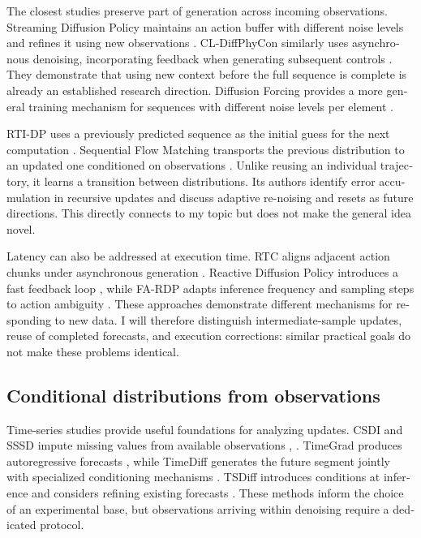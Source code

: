 \documentclass{article}
\begin{document}
\begin{otherlanguage}{english}
The closest studies preserve part of generation across incoming observations. Streaming Diffusion Policy maintains an action buffer with different noise levels and refines it using new observations \citep{p01}. CL-DiffPhyCon similarly uses asynchronous denoising, incorporating feedback when generating subsequent controls \citep{p02}. They demonstrate that using new context before the full sequence is complete is already an established research direction. Diffusion Forcing provides a more general training mechanism for sequences with different noise levels per element \citep{p05}.

RTI-DP uses a previously predicted sequence as the initial guess for the next computation \citep{p04}. Sequential Flow Matching transports the previous distribution to an updated one conditioned on observations \citep{p03}. Unlike reusing an individual trajectory, it learns a transition between distributions. Its authors identify error accumulation in recursive updates and discuss adaptive re-noising and resets as future directions. This directly connects to my topic but does not make the general idea novel.

Latency can also be addressed at execution time. RTC aligns adjacent action chunks under asynchronous generation \citep{p06}. Reactive Diffusion Policy introduces a fast feedback loop \citep{p07}, while FA-RDP adapts inference frequency and sampling steps to action ambiguity \citep{p08}. These approaches demonstrate different mechanisms for responding to new data. I will therefore distinguish intermediate-sample updates, reuse of completed forecasts, and execution corrections: similar practical goals do not make these problems identical.

\clearpage
\subsection{Conditional distributions from observations}

Time-series studies provide useful foundations for analyzing updates. CSDI and SSSD impute missing values from available observations \citep{p19}, \citep{p23}. TimeGrad produces autoregressive forecasts \citep{p20}, while TimeDiff generates the future segment jointly with specialized conditioning mechanisms \citep{p21}. TSDiff introduces conditions at inference and considers refining existing forecasts \citep{p24}. These methods inform the choice of an experimental base, but observations arriving within denoising require a dedicated protocol.


\end{otherlanguage}
\end{document}
